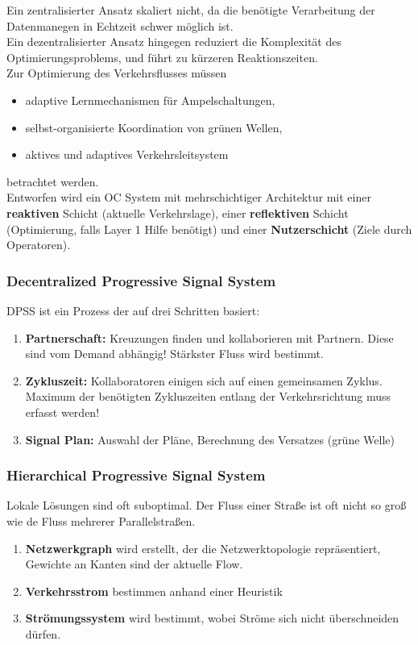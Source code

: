 \documentclass[a4paper]{article}
\begin{document}
Ein zentralisierter Ansatz skaliert nicht, da die benötigte Verarbeitung der Datenmanegen in Echtzeit schwer möglich ist.\\
Ein dezentralisierter Ansatz hingegen reduziert die Komplexität des Optimierungsproblems, und führt zu kürzeren Reaktionszeiten.\\

Zur Optimierung des Verkehrsflusses müssen
\begin{itemize}
	\item adaptive Lernmechanismen für Ampelschaltungen,
	\item selbst-organisierte Koordination von grünen Wellen,
	\item aktives und adaptives Verkehrsleitsystem
\end{itemize}
betrachtet werden.\\
Entworfen wird ein OC System mit mehrschichtiger Architektur mit einer \textbf{reaktiven} Schicht (aktuelle Verkehrslage), einer \textbf{reflektiven} Schicht (Optimierung, falls Layer 1 Hilfe benötigt) und einer \textbf{Nutzerschicht} (Ziele durch Operatoren).\\
\subsubsection{Decentralized Progressive Signal System}
DPSS ist ein Prozess der auf drei Schritten basiert:
\begin{enumerate}
	\item\textbf{ Partnerschaft:} Kreuzungen finden und kollaborieren mit Partnern. Diese sind vom Demand abhängig! Stärkster Fluss wird bestimmt.
	\item \textbf{Zykluszeit:} Kollaboratoren einigen sich auf einen gemeinsamen Zyklus. Maximum der benötigten Zykluszeiten entlang der Verkehrsrichtung muss erfasst werden!
	\item \textbf{Signal Plan:} Auswahl der Pläne, Berechnung des Versatzes (grüne Welle)
\end{enumerate}
\subsubsection{Hierarchical Progressive Signal System}
Lokale Lösungen sind oft suboptimal. Der Fluss einer Straße ist oft nicht so groß wie de Fluss mehrerer Parallelstraßen.
\begin{enumerate}
	\item \textbf{Netzwerkgraph} wird erstellt, der die Netzwerktopologie repräsentiert, Gewichte an Kanten sind der aktuelle Flow.
	\item \textbf{Verkehrsstrom} bestimmen anhand einer Heuristik
	\item \textbf{Strömungssystem} wird bestimmt, wobei Ströme sich nicht überschneiden dürfen.
\end{enumerate}
\end{document}

